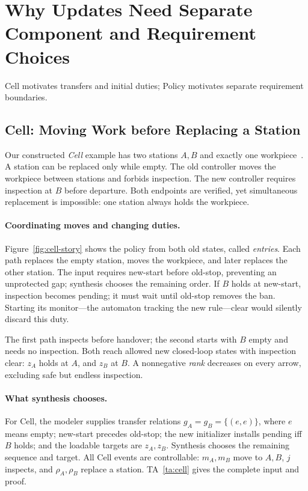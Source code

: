 \documentclass[acmsmall,screen,review,anonymous]{acmart}
\begin{document}
\FloatBarrier
\section{Why Updates Need Separate Component and Requirement Choices}
\label{sec:example}\label{sec:mechanism-boundary}
\label{sec:cell-example}
Cell motivates transfers and initial duties; Policy motivates separate requirement boundaries.

\subsection{Cell: Moving Work before Replacing a Station}
Our constructed \emph{Cell} example has two stations $A,B$ and exactly one workpiece~\cite{Lewerentz1995ProductionCell,Nahabedian2020}. A station can be replaced only while empty. The old controller moves the workpiece between stations and forbids inspection. The new controller requires inspection at $B$ before departure. Both endpoints are verified, yet simultaneous replacement is impossible: one station always holds the workpiece.



\paragraph{Coordinating moves and changing duties.}
Figure~\ref{fig:cell-story} shows the policy from both old states, called \emph{entries}. Each path replaces the empty station, moves the workpiece, and later replaces the other station. The input requires new-start before old-stop, preventing an unprotected gap; synthesis chooses the remaining order. If $B$ holds at new-start, inspection becomes pending; it must wait until old-stop removes the ban. Starting its monitor---the automaton tracking the new rule---clear would silently discard this duty.

The first path inspects before handover; the second starts with $B$ empty and needs no inspection. Both reach allowed new closed-loop states with inspection clear: $z_A$ holds at $A$, and $z_B$ at $B$. A nonnegative \emph{rank} decreases on every arrow, excluding safe but endless inspection.

\paragraph{What synthesis chooses.}
For Cell, the modeler supplies transfer relations $g_A=g_B=\{(e,e)\}$, where $e$ means empty; new-start precedes old-stop; the new initializer installs pending iff $B$ holds; and the loadable targets are $z_A,z_B$. Synthesis chooses the remaining sequence and target. All Cell events are controllable: $m_A,m_B$ move to $A,B$, $j$ inspects, and $\rho_A,\rho_B$ replace a station. TA~\ref{ta:cell} gives the complete input and proof.
\end{document}

